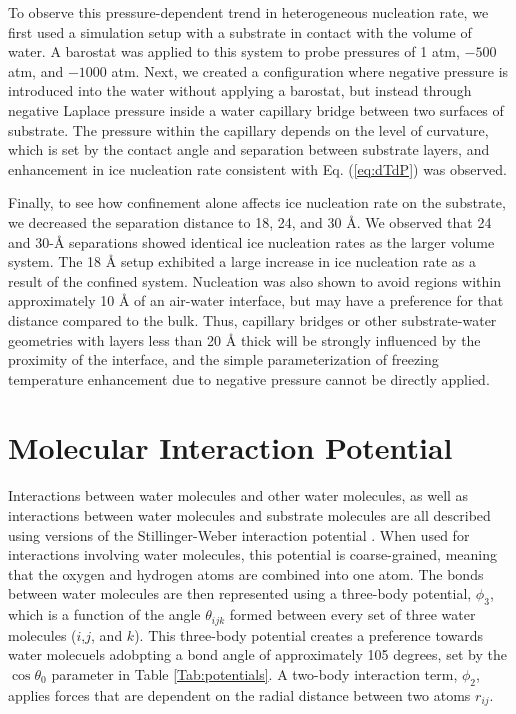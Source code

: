 \documentclass[journal abbreviation, manuscript]{copernicus}
\begin{document}
To observe this pressure-dependent trend in heterogeneous nucleation rate, we first used a simulation setup with a substrate in contact with the volume of water. A barostat was applied to this system to probe pressures of 1 atm, $-500$ atm, and $-1000$ atm. Next, we created a configuration where negative pressure is introduced into the water without applying a barostat, but instead through negative Laplace pressure inside a water capillary bridge between two surfaces of substrate. The pressure within the capillary depends on the level of curvature, which is set by the contact angle and separation between substrate layers, and enhancement in ice nucleation rate consistent with Eq. (\ref{eq:dTdP}) was observed.

Finally, to see how confinement alone affects ice nucleation rate on the substrate, we decreased the separation distance to 18, 24, and 30 \AA{}. We observed that 24 and 30-\AA{} separations showed identical ice nucleation rates as the larger volume system. The 18 \AA{} setup exhibited a large increase in ice nucleation rate as a result of the confined system. Nucleation was also shown to avoid regions within approximately 10 \AA{} of an air-water interface, but may have a preference for that distance compared to the bulk. Thus, capillary bridges or other substrate-water geometries with layers less than 20 \AA{} thick will be strongly influenced by the proximity of the interface, and the simple parameterization of freezing temperature enhancement due to negative pressure cannot be directly applied.  


\appendix
\section{Molecular Interaction Potential}\label{app: potential} 

Interactions between water molecules and other water molecules, as well as interactions between water molecules and substrate molecules are all described using versions of the Stillinger-Weber interaction potential \citep{stillinger1985computer}. When used for interactions involving water molecules, this potential is coarse-grained, meaning that the oxygen and hydrogen atoms are combined into one atom. The bonds between water molecules are then represented using a three-body potential, $\phi_{3}$, which is a function of the angle $\theta_{ijk}$ formed between every set of three water molecules ($i$,$j$, and $k$). This three-body potential creates a preference towards water molecuels adobpting a bond angle of approximately 105 degrees, set by the $\cos\theta_0$ parameter in Table \ref{Tab:potentials}. A two-body interaction term, $\phi_{2}$, applies forces that are dependent on the radial distance between two atoms $r_{ij}$.
\end{document}
